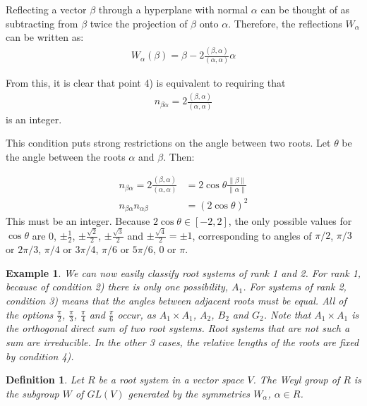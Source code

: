 \documentclass[10pt,a4paper]{article}
\newtheorem{example}[theorem]{Example}
\newtheorem{definition}[theorem]{Definition}
\begin{document}
Reflecting a vector $\beta$ through a hyperplane with normal $\alpha$ can be thought of as subtracting from $\beta$ twice the projection of $\beta$ onto $\alpha$. Therefore, the reflections $W_\alpha$ can be written as:
\begin{align*}
	W_\alpha(\beta) = \beta - 2 \frac{(\beta, \alpha)}{(\alpha, \alpha)} \alpha
\end{align*}

From this, it is clear that point 4) is equivalent to requiring that
\begin{align*}
	n_{\beta \alpha} = 2 \frac{(\beta, \alpha)}{(\alpha, \alpha)}
\end{align*}
is an integer.

This condition puts strong restrictions on the angle between two roots. Let $\theta$ be the angle between the roots $\alpha$ and $\beta$. Then:

\begin{align*}
	n_{\beta \alpha} = 2 \frac{(\beta, \alpha)}{(\alpha, \alpha)} &= 2 \cos{\theta} \frac{\|\beta \|}{\| \alpha \|} \\
	n_{\beta \alpha} n_{\alpha \beta} &= (2 \cos \theta)^2
\end{align*}
This must be an integer. Because $2 \cos \theta \in [-2, 2]$, the only possible values for $\cos \theta$ are 0, $\pm \frac{1}{2}$, $\pm \frac{\sqrt{2}}{2}$, $\pm \frac{\sqrt{3}}{2}$ and $\pm \frac{\sqrt{4}}{2} = \pm 1$, corresponding to angles of $\pi/2$, $\pi/3$ or $2 \pi/3$, $\pi/4$ or $3 \pi/4$, $\pi/6$ or $5 \pi/6$, $0$ or $\pi$.

\begin{example}
We can now easily classify root systems of rank 1 and 2. For rank 1, because of condition 2) there is only one possibility, $A_1$. For systems of rank 2, condition 3) means that the angles between adjacent roots must be equal. All of the options $\frac{\pi}{2}$, $\frac{\pi}{3}$, $\frac{\pi}{4}$ and $\frac{\pi}{6}$ occur, as $A_1 \times A_1$, $A_2$, $B_2$ and $G_2$. Note that $A_1 \times A_1$ is the orthogonal direct sum of two root systems. Root systems that are not such a sum are \emph{irreducible}. In the other 3 cases, the relative lengths of the roots are fixed by condition 4).
\end{example}

\begin{definition}
Let $R$ be a root system in a vector space $V$. The Weyl group of $R$ is the subgroup $W$ of $GL(V)$ generated by the symmetries $W_\alpha$, $\alpha \in R$.
\end{definition}
\end{document}

